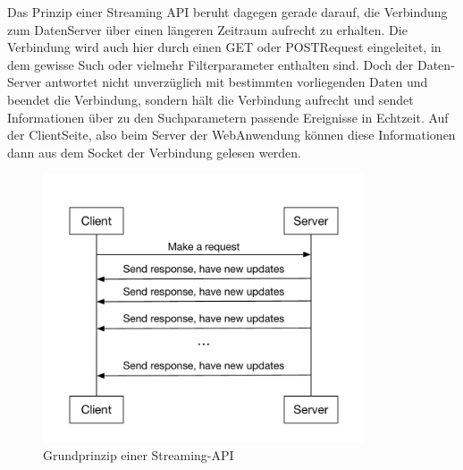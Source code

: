 Das Prinzip einer Streaming API beruht dagegen gerade darauf, die Verbindung zum Daten­Server
über einen längeren Zeitraum aufrecht zu erhalten. Die Verbindung wird auch hier durch einen
GET­ oder POST­Request eingeleitet, in dem gewisse Such­ oder vielmehr Filterparameter
enthalten sind. Doch der Daten­Server antwortet nicht unverzüglich mit bestimmten vorliegenden
Daten und beendet die Verbindung, sondern hält die Verbindung aufrecht und sendet
Informationen über zu den Suchparametern passende Ereignisse in Echtzeit. Auf der Client­Seite,
also beim Server der Web­Anwendung können diese Informationen dann aus dem Socket der
Verbindung gelesen werden. \\

\begin{figure}
    \centering
    \includegraphics[width=0.85\textwidth]{Graphics/streaming_api}
    \caption{Grundprinzip einer Streaming-API}
   \label{fig:streamapi}
\end{figure}

